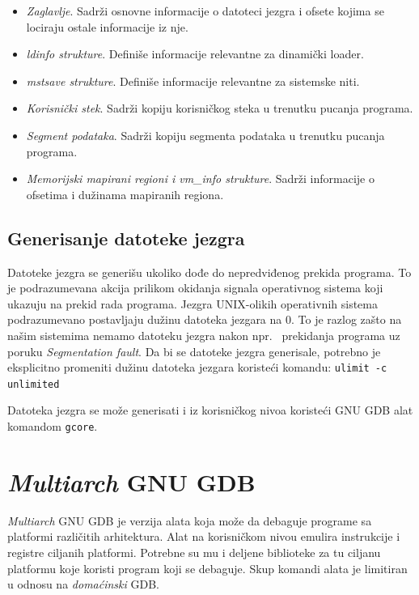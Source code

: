\documentclass[12pt,oneside]{memoir}
\begin{document}
\begin{itemize}
	\item \emph{Zaglavlje}. Sadrži osnovne informacije o datoteci jezgra i ofsete kojima se lociraju ostale informacije iz nje.
	\item \emph{ldinfo strukture}. Definiše informacije relevantne za dinamički loader.
	\item \emph{mstsave strukture}. Definiše informacije relevantne za sistemske niti.
	\item \emph{Korisnički stek}. Sadrži kopiju korisničkog steka u trenutku pucanja programa.
	\item \emph{Segment podataka}. Sadrži kopiju segmenta podataka u trenutku pucanja programa.
	\item \emph{Memorijski mapirani regioni i vm\_info strukture}. Sadrži informacije o ofsetima i dužinama mapiranih regiona.
\end{itemize}

\subsection{Generisanje datoteke jezgra}

Datoteke jezgra se generišu ukoliko dođe do nepredviđenog prekida programa. To je podrazumevana akcija prilikom okidanja signala operativnog sistema koji ukazuju na prekid rada programa. Jezgra UNIX-olikih operativnih sistema podrazumevano postavljaju dužinu datoteka jezgara na 0. To je razlog zašto na našim sistemima nemamo datoteku jezgra nakon npr.~ prekidanja programa uz poruku \emph{Segmentation fault}. Da bi se datoteke jezgra generisale, potrebno je eksplicitno promeniti dužinu datoteka jezgara koristeći komandu:
\newline
\texttt{ulimit -c unlimited}

Datoteka jezgra se može generisati i iz korisničkog nivoa koristeći GNU GDB alat komandom \texttt{gcore}.

\section{\emph{Multiarch} GNU GDB}

\emph{Multiarch} GNU GDB je verzija alata koja može da debaguje programe sa platformi različitih arhitektura. Alat na korisničkom nivou emulira instrukcije i registre ciljanih platformi. Potrebne su mu i deljene biblioteke za tu ciljanu platformu koje koristi program koji se debaguje. Skup komandi alata je limitiran u odnosu na \emph{domaćinski} GDB.
\end{document}
